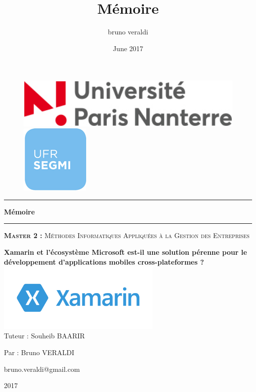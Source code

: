 \documentclass[11]{article}
\title{Mémoire}
\author{bruno veraldi }
\date{June 2017}
\begin{document}
\begin{titlepage}
\begin{figure}[h]
    \begin{minipage}[c]{.16\linewidth}
        \centering
        \includegraphics[width=4\textwidth]{logo-univ}
    \end{minipage}
    \hfill%
    \begin{minipage}[c]{.16\linewidth}
        \centering
        \includegraphics{ufrSegmi}
    \end{minipage}
\end{figure}
\begin{center}

\noindent\rule{12cm}{0.4pt}
{ \huge \bfseries Mémoire   \\[0.4cm] }
\noindent\rule{12cm}{0.4pt}

\vspace{1cm}

\textsc{\Large \textbf{Master 2 :}  Méthodes Informatiques Appliquées à la Gestion des Entreprises }\\[0.5cm]

\vspace{0.5cm}

\textbf{\Large Xamarin et l'écosystème Microsoft est-il une solution pérenne
pour le développement d’applications mobiles cross-plateformes ?}\\[0.9cm]


\includegraphics[width=0.6\textwidth]{xamarin-logo}~\\[1cm]


\Large {Tuteur : Souheib BAARIR}

\vspace{0.5cm}

\Large {Par : Bruno VERALDI} 

\Large {bruno.veraldi@gmail.com}

\vspace{0.5cm}

\Large {2017} 

\end{center}


\end{titlepage}
 
\end{document}

